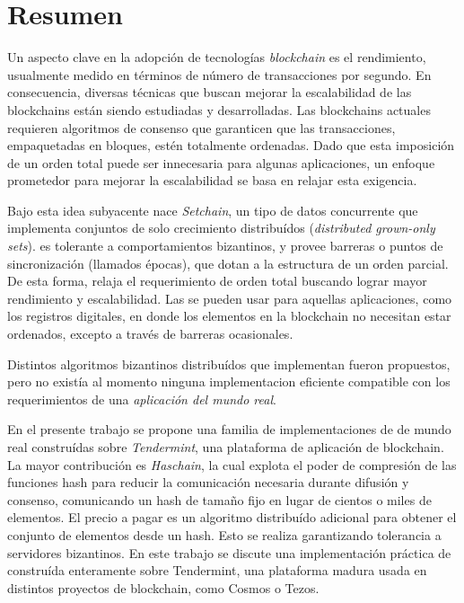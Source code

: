   \chapter*{Resumen}
  Un aspecto clave en la adopción de tecnologías \textit{blockchain} es el rendimiento,
  usualmente medido en términos de número de transacciones por segundo.
  En consecuencia, diversas técnicas que buscan mejorar la escalabilidad de las blockchains
  están siendo estudiadas y desarrolladas.
  Las blockchains actuales requieren algoritmos de consenso que garanticen que las
  transacciones, empaquetadas en bloques, estén totalmente ordenadas.
  Dado que esta imposición de un orden total puede ser innecesaria para algunas aplicaciones,
  un enfoque prometedor para mejorar la escalabilidad se basa en relajar esta exigencia.

  Bajo esta idea subyacente nace \textit{Setchain}, un tipo de
  datos concurrente que implementa conjuntos de solo crecimiento distribuídos 
  (\textit{distributed grown-only sets}).
  \setchain
  es tolerante a comportamientos bizantinos, y provee barreras o puntos de sincronización
  (llamados épocas), que dotan a la estructura de un orden parcial.
  De esta forma, relaja el requerimiento de orden total buscando lograr mayor
  rendimiento y escalabilidad.
  Las \setchains se pueden usar para aquellas aplicaciones, como los registros digitales,
  en donde los elementos en la blockchain no necesitan estar ordenados, excepto a través
  de barreras ocasionales.
  
  
  Distintos algoritmos bizantinos distribuídos que implementan \setchain fueron
  propuestos, pero no existía al momento ninguna implementacion eficiente compatible con
  los requerimientos de una \textit{aplicación del mundo real}.
  
  En el presente trabajo se propone una familia de implementaciones de \setchain 
  de mundo real construídas sobre \textit{Tendermint}, una plataforma de
  aplicación de blockchain.  
  La mayor contribución es \textit{Haschain}, la cual explota el poder de compresión de las
  funciones hash para reducir la comunicación necesaria durante difusión y consenso,
  comunicando un hash de tamaño fijo en lugar de cientos o miles de elementos.
  El precio a pagar es un algoritmo distribuído adicional para obtener el conjunto de
  elementos desde un hash. Esto se realiza garantizando tolerancia a servidores bizantinos.
  En este trabajo se discute una implementación práctica de \hashchain construída enteramente
  sobre Tendermint, una plataforma madura usada en distintos proyectos de blockchain, como
  Cosmos o Tezos.

